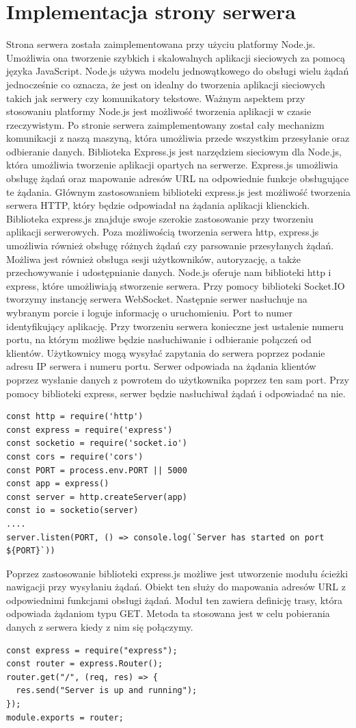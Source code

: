 \section{Implementacja strony serwera}
Strona serwera została zaimplementowana przy użyciu platformy Node.js. Umożliwia ona tworzenie szybkich i skalowalnych aplikacji sieciowych za pomocą języka JavaScript. Node.js używa modelu jednowątkowego do obsługi wielu żądań jednocześnie co oznacza, że jest on idealny do tworzenia aplikacji sieciowych takich jak serwery czy komunikatory tekstowe. Ważnym aspektem przy stosowaniu platformy Node.js jest możliwość tworzenia aplikacji w czasie rzeczywistym. Po stronie serwera zaimplementowany został cały mechanizm komunikacji z naszą maszyną, która umożliwia przede wszystkim przesyłanie oraz odbieranie danych.
Biblioteka Express.js  jest narzędziem sieciowym dla Node.js, która umożliwia tworzenie aplikacji opartych na serwerze. Express.js umożliwia obsługę żądań oraz mapowanie adresów URL na odpowiednie funkcje obsługujące te żądania. Głównym zastosowaniem biblioteki express.js jest możliwość tworzenia serwera HTTP, który będzie odpowiadał na żądania aplikacji klienckich. Biblioteka express.js znajduje swoje szerokie zastosowanie przy tworzeniu aplikacji serwerowych. Poza możliwością tworzenia serwera http, express.js umożliwia również obsługę różnych żądań czy parsowanie przesyłanych żądań. Możliwa jest również obsługa sesji użytkowników, autoryzację, a także przechowywanie i udostępnianie danych.
Node.js oferuje nam biblioteki http i express, które umożliwiają stworzenie serwera. Przy pomocy biblioteki Socket.IO tworzymy instancję serwera WebSocket. Następnie serwer nasłuchuje na wybranym porcie i loguje informację o uruchomieniu. Port to numer identyfikujący aplikację. Przy tworzeniu serwera konieczne jest ustalenie numeru portu, na którym możliwe będzie nasłuchiwanie i odbieranie połączeń od klientów. Użytkownicy mogą wysyłać zapytania do serwera poprzez podanie adresu IP serwera i numeru portu. Serwer odpowiada na żądania klientów poprzez wysłanie danych z powrotem do użytkownika poprzez ten sam port. Przy pomocy biblioteki express, serwer będzie nasłuchiwał żądań i odpowiadać na nie. 
\begin{lstlisting}[caption=Implementacja serwera]
const http = require('http')
const express = require('express')
const socketio = require('socket.io')
const cors = require('cors')
const PORT = process.env.PORT || 5000
const app = express()
const server = http.createServer(app)
const io = socketio(server)
....
server.listen(PORT, () => console.log(`Server has started on port ${PORT}`))
\end{lstlisting}
Poprzez zastosowanie biblioteki express.js możliwe jest utworzenie modułu ścieżki nawigacji przy wysyłaniu żądań. Obiekt ten służy do mapowania adresów URL z odpowiednimi funkcjami obsługi żądań. Moduł ten zawiera definicję trasy, która odpowiada żądaniom typu GET. Metoda ta stosowana jest w celu pobierania danych z serwera kiedy z nim się połączymy.
\begin{lstlisting}[caption=Implementacja ścieżki serwera]
const express = require("express");
const router = express.Router();
router.get("/", (req, res) => {
  res.send("Server is up and running");
});
module.exports = router;
\end{lstlisting}
